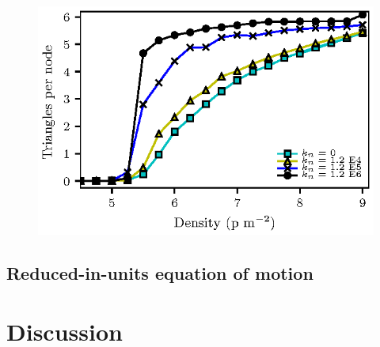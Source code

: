 \documentclass[preprint,12pt]{elsarticle}
\begin{document}
\begin{figure}[!htbp]
\centering
    \ 
    \\
\caption[width=0.47\columnwidth]{}
\label{network_corridor}
\end{figure}



\begin{figure}[htbp!]
\centering
\includegraphics[width=0.7\columnwidth]
{./triangles.eps}
\caption{\label{} }
\end{figure}




\subsection{\label{reduced-in-units} Reduced-in-units equation of motion}


\section{\label{discussion}Discussion}
\end{document}
